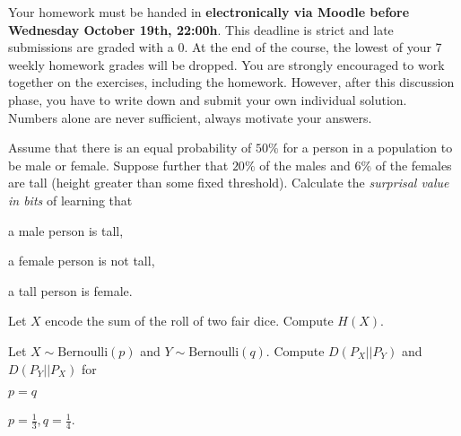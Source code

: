 \documentclass[a4paper,10pt,landscape,twocolumn]{scrartcl}
\newcommand\deadline{Wednesday October 19th, 22:00h}
\begin{document}
\homeworkproblems

{\sffamily\noindent
Your homework must be handed in \textbf{electronically via Moodle before \deadline}.  This deadline is strict and late submissions are graded with a 0. At the end of the course, the lowest of your 7 weekly homework grades will be dropped. You are strongly encouraged to work together on the exercises, including the homework. However, after this discussion phase, you have to write down and submit your own individual solution. Numbers alone are never sufficient, always motivate your answers.
}

\begin{exercise}
Assume that there is an equal probability of $50\%$ for a person in a population to be male or female. Suppose further that $20\%$ of the males and $6\%$ of the females are tall (height greater than some fixed threshold). Calculate the \emph{surprisal value in bits} of learning that

\begin{subex}
a male person is tall, 
\end{subex}

\begin{subex}
a female person is not tall, 
\end{subex}

\begin{subex}
a tall person is female.
\end{subex}

\end{exercise}

\begin{exercise}
Let $X$ encode the sum of the roll of two fair dice. Compute $H(X)$.
\end{exercise}

\begin{exercise}
Let $X \sim \text{Bernoulli}(p)$ and $Y \sim \text{Bernoulli}(q)$. Compute $D(P_X || P_Y)$ and $D(P_Y || P_X)$ for 

\begin{subex}
$p=q$
\end{subex}

\begin{subex}
$p=\frac 1 3, q=\frac 1 4$.
\end{subex}

\end{exercise}
\end{document}
